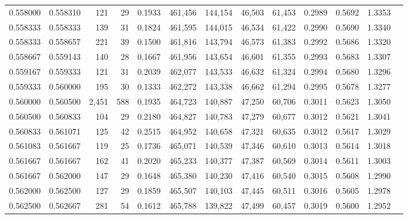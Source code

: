 \begin{tabular}{rrrrrrrrrrrrr}
0.558000 & 0.558310 &   121 &  29 &                                     0.1933 & 461,456 & 144,154 &  46,503 &  61,453 & 0.2989 & 0.5692 & 1.3353 \\
0.558333 & 0.558333 &   139 &  31 &                                     0.1824 & 461,595 & 144,015 &  46,534 &  61,422 & 0.2990 & 0.5690 & 1.3340 \\
0.558333 & 0.558657 &   221 &  39 &                                     0.1500 & 461,816 & 143,794 &  46,573 &  61,383 & 0.2992 & 0.5686 & 1.3320 \\
0.558667 & 0.559143 &   140 &  28 &                                     0.1667 & 461,956 & 143,654 &  46,601 &  61,355 & 0.2993 & 0.5683 & 1.3307 \\
0.559167 & 0.559333 &   121 &  31 &                                     0.2039 & 462,077 & 143,533 &  46,632 &  61,324 & 0.2994 & 0.5680 & 1.3296 \\
0.559333 & 0.560000 &   195 &  30 &                                     0.1333 & 462,272 & 143,338 &  46,662 &  61,294 & 0.2995 & 0.5678 & 1.3277 \\
0.560000 & 0.560500 & 2,451 & 588 &                                     0.1935 & 464,723 & 140,887 &  47,250 &  60,706 & 0.3011 & 0.5623 & 1.3050 \\
0.560500 & 0.560833 &   104 &  29 &                                     0.2180 & 464,827 & 140,783 &  47,279 &  60,677 & 0.3012 & 0.5621 & 1.3041 \\
0.560833 & 0.561071 &   125 &  42 &                                     0.2515 & 464,952 & 140,658 &  47,321 &  60,635 & 0.3012 & 0.5617 & 1.3029 \\
0.561083 & 0.561667 &   119 &  25 &                                     0.1736 & 465,071 & 140,539 &  47,346 &  60,610 & 0.3013 & 0.5614 & 1.3018 \\
0.561667 & 0.561667 &   162 &  41 &                                     0.2020 & 465,233 & 140,377 &  47,387 &  60,569 & 0.3014 & 0.5611 & 1.3003 \\
0.561667 & 0.562000 &   147 &  29 &                                     0.1648 & 465,380 & 140,230 &  47,416 &  60,540 & 0.3015 & 0.5608 & 1.2990 \\
0.562000 & 0.562500 &   127 &  29 &                                     0.1859 & 465,507 & 140,103 &  47,445 &  60,511 & 0.3016 & 0.5605 & 1.2978 \\
0.562500 & 0.562667 &   281 &  54 &                                     0.1612 & 465,788 & 139,822 &  47,499 &  60,457 & 0.3019 & 0.5600 & 1.2952 \\

\end{tabular}
